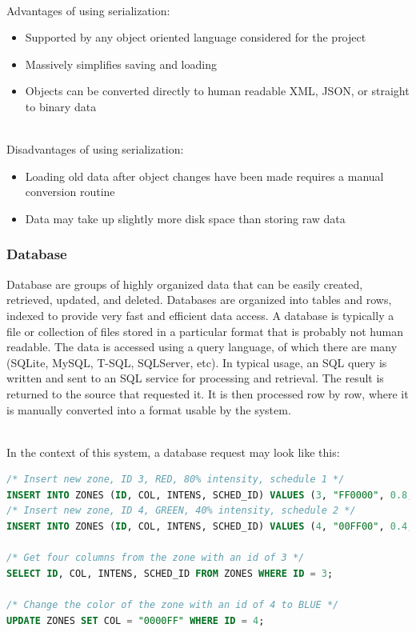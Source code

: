 \documentclass[onecolumn, draftclsnofoot,10pt, compsoc]{IEEEtran}
\begin{document}
		\noindent \\Advantages of using serialization:
		\begin{itemize}
			\item Supported by any object oriented language considered for the project
			\item Massively simplifies saving and loading
			\item Objects can be converted directly to human readable XML, JSON, or straight to binary data
		\end{itemize}

		\noindent \\Disadvantages of using serialization:
		\begin{itemize}
			\item Loading old data after object changes have been made requires a manual conversion routine
			\item Data may take up slightly more disk space than storing raw data
		\end{itemize}


		\subsubsection{Database}
		Database are groups of highly organized data that can be easily created, retrieved, updated, and deleted. \cite{database1}
		Databases are organized into tables and rows, indexed to provide very fast and efficient data access.
		A database is typically a file or collection of files stored in a particular format that is probably not human readable.
		The data is accessed using a query language, of which there are many (SQLite, MySQL, T-SQL, SQLServer, etc).
		In typical usage, an SQL query is written and sent to an SQL service for processing and retrieval.
		The result is returned to the source that requested it.
		It is then processed row by row, where it is manually converted into a format usable by the system.

		\noindent \\In the context of this system, a database request may look like this:
		\begin{lstlisting}[language=SQL]
/* Insert new zone, ID 3, RED, 80% intensity, schedule 1 */
INSERT INTO ZONES (ID, COL, INTENS, SCHED_ID) VALUES (3, "FF0000", 0.8, 1);
/* Insert new zone, ID 4, GREEN, 40% intensity, schedule 2 */
INSERT INTO ZONES (ID, COL, INTENS, SCHED_ID) VALUES (4, "00FF00", 0.4, 2);

/* Get four columns from the zone with an id of 3 */
SELECT ID, COL, INTENS, SCHED_ID FROM ZONES WHERE ID = 3;

/* Change the color of the zone with an id of 4 to BLUE */
UPDATE ZONES SET COL = "0000FF" WHERE ID = 4;
\end{lstlisting}
\end{document}
